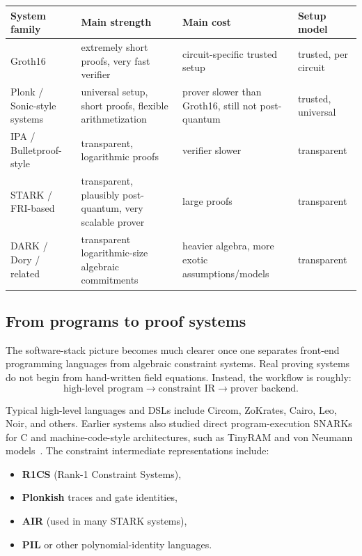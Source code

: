 \documentclass[11pt]{article}
\begin{document}
\begin{center}
\begin{tabular}{>{\raggedright\arraybackslash}p{2.3cm} >{\raggedright\arraybackslash}p{2.9cm} >{\raggedright\arraybackslash}p{3.0cm} >{\raggedright\arraybackslash}p{3.0cm}}
\toprule
System family & Main strength & Main cost & Setup model \\
\midrule
Groth16 \cite{Groth2016} & extremely short proofs, very fast verifier & circuit-specific trusted setup & trusted, per circuit \\
Plonk / Sonic-style systems \cite{GabizonWilliamsonCiobotaru2019,MallerBoweKohlweissMeiklejohn2019} & universal setup, short proofs, flexible arithmetization & prover slower than Groth16, still not post-quantum & trusted, universal \\
IPA / Bulletproof-style \cite{Bulletproofs2018} & transparent, logarithmic proofs & verifier slower & transparent \\
STARK / FRI-based \cite{BenSassonBentovHoreshRiabzev2018STARK,BenSassonBentovHoreshRiabzev2018FRI} & transparent, plausibly post-quantum, very scalable prover & large proofs & transparent \\
DARK / Dory / related \cite{Lee2021Dory,BunzFischSzepieniec2020DARK} & transparent logarithmic-size algebraic commitments & heavier algebra, more exotic assumptions/models & transparent \\
\bottomrule
\end{tabular}
\end{center}

\subsection{From programs to proof systems}

The software-stack picture becomes much clearer once one separates front-end programming languages from algebraic constraint systems. Real proving systems do not begin from hand-written field equations. Instead, the workflow is roughly:
\[
\text{high-level program} \longrightarrow \text{constraint IR} \longrightarrow \text{prover backend}.
\]

Typical high-level languages and DSLs include Circom, ZoKrates, Cairo, Leo, Noir, and others. Earlier systems also studied direct program-execution SNARKs for C and machine-code-style architectures, such as TinyRAM and von Neumann models~\cite{BenSassonChiesaGenkinTromerVirza2013,BenSassonChiesaTromerVirza2014}. The constraint intermediate representations include:
\begin{itemize}[leftmargin=2em]
    \item \textbf{R1CS} (Rank-1 Constraint Systems),
    \item \textbf{Plonkish} traces and gate identities,
    \item \textbf{AIR} (used in many STARK systems),
    \item \textbf{PIL} or other polynomial-identity languages.
\end{itemize}
\end{document}
